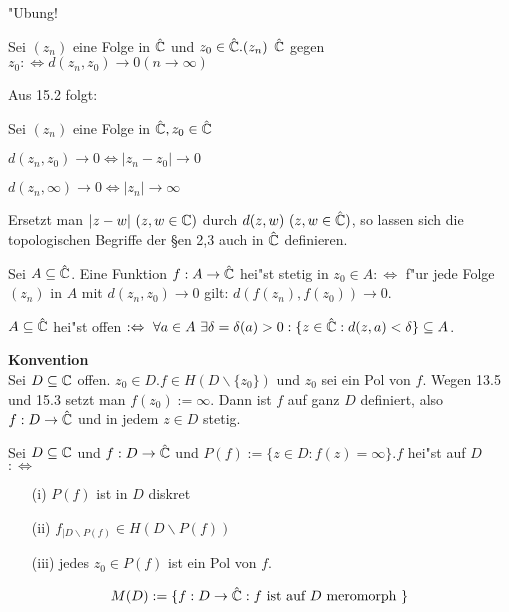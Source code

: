 \documentclass[a4paper,twoside,DIV15,BCOR12mm]{scrbook}
\begin{document}
\begin{beweis}
"Ubung!
\end{beweis}

\begin{definition}
Sei $(z_n)$ eine Folge in $\hat{\mathbb{C}}$ und $z_0 \in \hat{\mathbb{C}}. (z_n)$  $\hat{\mathbb{C}}$ gegen $z_0 :\Leftrightarrow d(z_n,z_0) \rightarrow 0 (n \rightarrow \infty)$
\end{definition}

Aus 15.2 folgt:
\begin{satz}
Sei $(z_n)$ eine Folge in $\hat{\mathbb{C}}, z_0 \in \hat{\mathbb{C}}$
\begin{liste}
\item $d(z_n,z_0) \rightarrow 0 \Leftrightarrow |z_n-z_0| \rightarrow 0$
\item $d(z_n,\infty) \rightarrow 0 \Leftrightarrow |z_n| \rightarrow \infty$
\end{liste}
\end{satz}

Ersetzt man $|z-w| \ (z,w \in \mathbb{C})$ durch $d(z,w) \ (z,w \in \hat{\mathbb{C}})$, so lassen sich die topologischen Begriffe der §en 2,3 auch in $\hat{\mathbb{C}}$ definieren.

\begin{beispiele}
\item Sei $A \subseteq \hat{\mathbb{C}}$. Eine Funktion $f: A \rightarrow \hat{\mathbb{C}}$ hei"st stetig in $z_0 \in A :\Leftrightarrow$ f"ur jede Folge $(z_n)$ in $A$ mit $d(z_n,z_0) \rightarrow 0$ gilt: $d(f(z_n),f(z_0)) \rightarrow 0$.
\item $A \subseteq \hat{\mathbb{C}}$ hei"st offen $: \Leftrightarrow \ \forall a \in A \ \exists \delta = \delta(a) > 0: \{ z \in \hat{\MdC}: d(z,a) < \delta \} \subseteq A$.
\end{beispiele}

{\bf Konvention}\\
Sei $D \subseteq \mathbb{C}$ offen. $z_0 \in D. f \in H(D \backslash\{z_0\})$ und $z_0$ sei ein  Pol von $f$. Wegen 13.5 und 15.3 setzt man $f(z_0):=\infty$. Dann ist $f$ auf ganz $D$ definiert, also $f: D \rightarrow \hat{\mathbb{C}}$ und in jedem $z \in D$ stetig.

\begin{definition}
Sei $D \subseteq \mathbb{C}$ und $f: D \rightarrow \hat{\mathbb{C}}$ und $P(f) := \{ z \in D: f(z) = \infty\}. f$ hei"st auf $D$  $:\Leftrightarrow$
\begin{itemize}
\item[(i)] $P(f)$ ist in $D$ diskret
\item[(ii)] $f_{|D \backslash P(f)} \in H( D \backslash P(f))$
\item[(iii)] jedes $z_0 \in P(f)$ ist ein Pol von $f$.
\end{itemize}
\end{definition}
\[
M(D) := \{ f: D \rightarrow \hat{\mathbb{C}}: f \mbox{ ist auf } D \mbox{ meromorph } \}
\]
\end{document}
